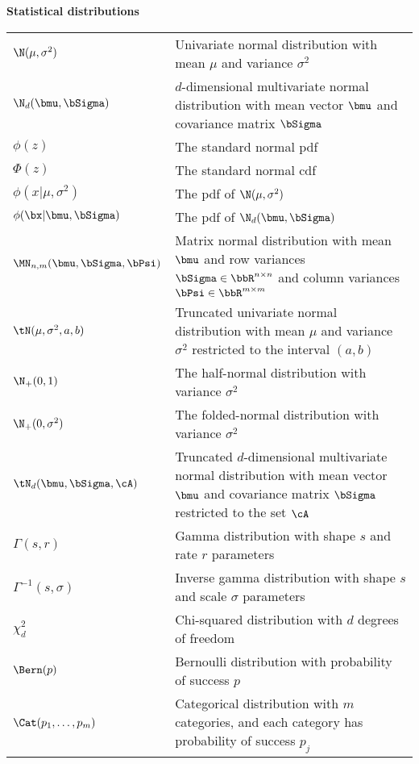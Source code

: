 \noindent\textbf{Statistical distributions}

\begin{longtable}{p{}p{}}
  $\N(\mu,\sigma^2)$ & Univariate normal distribution with mean $\mu$ and variance $\sigma^2$ \\
  $\N_d(\bmu,\bSigma)$  & $d$-dimensional multivariate normal distribution with mean vector $\bmu$ and covariance matrix $\bSigma$ \\
  $\phi(z)$  & The standard normal pdf \\  
  $\Phi(z)$  & The standard normal cdf \\  
  $\phi(x|\mu,\sigma^2)$  & The pdf of $\N(\mu,\sigma^2)$ \\  
  $\phi(\bx|\bmu,\bSigma)$  & The  pdf of $\N_d(\bmu,\bSigma)$\\  
  $\MN_{n,m}(\bmu,\bSigma,\bPsi)$  & Matrix normal distribution with mean $\bmu$ and row variances $\bSigma\in\bbR^{n\times n}$ and column variances $\bPsi\in\bbR^{m\times m}$ \\  
  $\tN(\mu,\sigma^2,a,b)$ & Truncated univariate normal distribution with mean $\mu$ and variance $\sigma^2$ restricted to the interval $(a,b)$ \\
  $\N_+(0,1)$ & The half-normal distribution with variance $\sigma^2$   \\    
  $\N_+(0,\sigma^2)$ & The folded-normal distribution with variance $\sigma^2$   \\  
  $\tN_d(\bmu,\bSigma,\cA)$  & Truncated $d$-dimensional multivariate normal distribution with mean vector $\bmu$ and covariance matrix $\bSigma$ restricted to the set $\cA$ \\  
  $\Gamma(s,r)$ & Gamma distribution with shape $s$ and rate $r$ parameters  \\  
  $\Gamma^{-1}(s,\sigma)$ & Inverse gamma distribution with shape $s$ and scale $\sigma$ parameters  \\    
  $\chi_d^2$  & Chi-squared distribution with $d$ degrees of freedom \\    
  $\Bern(p)$ & Bernoulli distribution with probability of success $p$ \\
  $\Cat(p_1,\dots,p_m)$ & Categorical distribution with $m$ categories, and each category has probability of success $p_j$ \\  
\end{longtable}
